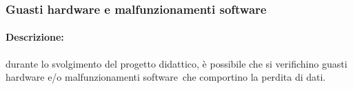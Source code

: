 \documentclass[../PianoProgetto.tex]{subfiles}
\begin{document}
\newpage
	\subsubsection{Guasti hardware e malfunzionamenti software}
	\label{sec:Guasti hardware e malfunzionamenti software}
	
	\paragraph*{Descrizione:} durante lo svolgimento del progetto didattico, è possibile che si verifichino guasti hardware e/o malfunzionamenti software\g\ che comportino la perdita di dati.
	
	
\end{document}
